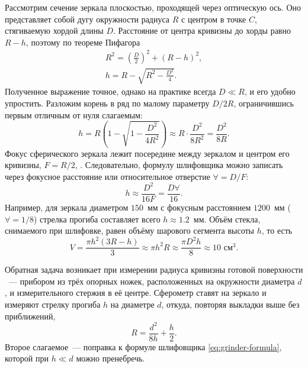 Рассмотрим сечение зеркала плоскостью, проходящей через оптическую ось. Оно представляет собой дугу окружности радиуса $R$ с центром в точке $C$, стягиваемую хордой длины $D$. Расстояние от центра кривизны до хорды равно $R - h$, поэтому по теореме Пифагора
\begin{gather*}
    R^2 = \left(\frac{D}{2}\right)^2 + (R - h)^2,\\
    h = R - \sqrt{R^2 - \frac{D^2}{4}}.
\end{gather*}
Полученное выражение точное, однако на практике всегда $D \ll R$, и его удобно упростить. Разложим корень в ряд по малому параметру $D/2R$, ограничившись первым отличным от нуля слагаемым:
\begin{equation}
    h = R \left(1 - \sqrt{1 - \frac{D^2}{4R^2}}\right)
      \approx R \cdot \frac{D^2}{8R^2}
      = \frac{D^2}{8R}.
    \label{eq:grinder-formula}
\end{equation}
Фокус сферического зеркала лежит посередине между зеркалом и центром его кривизны, $F = R/2$, . Следовательно, формулу шлифовщика можно записать через фокусное расстояние или относительное отверстие $\forall = D/F$:
\begin{equation}
    h \approx \frac{D^2}{16F} = \frac{D \forall}{16}.
\end{equation}
Например, для зеркала диаметром $150$~мм с фокусным расстоянием $1200$~мм ($\forall = 1/8$) стрелка прогиба составляет всего $h \approx 1.2$~мм. Объём стекла, снимаемого при шлифовке, равен объёму шарового сегмента высоты $h$, то есть
\begin{equation*}
    V = \frac{\pi h^2 (3R - h)}{3} \approx \pi h^2 R \approx \frac{\pi D^2 h}{8} \approx 10\text{ см}^3.
\end{equation*}

Обратная задача возникает при измерении радиуса кривизны готовой поверхности ~--- прибором из трёх опорных ножек, расположенных на окружности диаметра $d$, и измерительного стержня в её центре. Сферометр ставят на зеркало и измеряют стрелку прогиба $h$ на диаметре $d$, откуда, повторяя выкладки выше без приближений,
\begin{equation}
    R = \frac{d^2}{8h} + \frac{h}{2}.
\end{equation}
Второе слагаемое~--- поправка к формуле шлифовщика \eqref{eq:grinder-formula}, которой при $h \ll d$ можно пренебречь.

